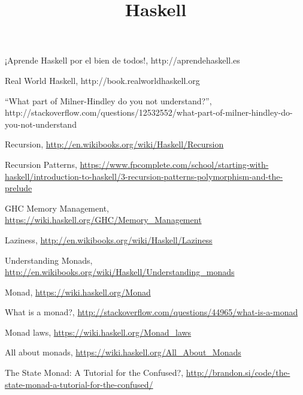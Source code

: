 \documentclass{article}
\title{Haskell}
\begin{document}
  \lstset{language=Haskell}
  \maketitle

  

  

  

  

  

  

  



\begin{thebibliography}{3}

  ¡Aprende Haskell por el bien de todos!, http://aprendehaskell.es

  Real World Haskell, http://book.realworldhaskell.org

  “What part of Milner-Hindley do you not understand?”, http://stackoverflow.com/questions/12532552/what-part-of-milner-hindley-do-you-not-understand

  Recursion, \url{http://en.wikibooks.org/wiki/Haskell/Recursion}

  Recursion Patterns,
  \url{https://www.fpcomplete.com/school/starting-with-haskell/introduction-to-haskell/3-recursion-patterns-polymorphism-and-the-prelude}

  GHC Memory Management, \url{https://wiki.haskell.org/GHC/Memory_Management}

  Laziness, \url{http://en.wikibooks.org/wiki/Haskell/Laziness}

  Understanding Monads, \url{http://en.wikibooks.org/wiki/Haskell/Understanding_monads}

  Monad, \url{https://wiki.haskell.org/Monad}

  What is a monad?, \url{http://stackoverflow.com/questions/44965/what-is-a-monad}

  Monad laws, \url{https://wiki.haskell.org/Monad_laws}

  All about monads, \url{https://wiki.haskell.org/All_About_Monads}

  The State Monad: A Tutorial for the Confused?, \url{http://brandon.si/code/the-state-monad-a-tutorial-for-the-confused/}

\end{thebibliography}
\end{document}
